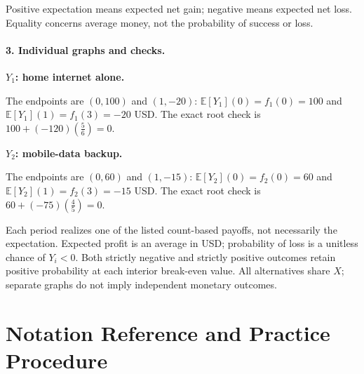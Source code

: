 Positive expectation means expected net gain; negative means expected net loss. Equality concerns average money, not the probability of success or loss.
\clearpage\paragraph{3. Individual graphs and checks.}
\textbf{$Y_1$: home internet alone.}
\begin{center}\end{center}
The endpoints are $(0,100)$ and $(1,-20)$: $\mathbb E[Y_1](0)=f_1(0)=100$ and
$\mathbb E[Y_1](1)=f_1(3)=-20$ USD.
The exact root check is $100+(-120)(\frac{5}{6})=0$.
\par\medskip
\textbf{$Y_2$: mobile-data backup.}
\begin{center}\end{center}
The endpoints are $(0,60)$ and $(1,-15)$: $\mathbb E[Y_2](0)=f_2(0)=60$ and
$\mathbb E[Y_2](1)=f_2(3)=-15$ USD.
The exact root check is $60+(-75)(\frac{4}{5})=0$.
\par\medskip
Each period realizes one of the listed count-based payoffs, not necessarily the expectation.
Expected profit is an average in USD; probability of loss is a unitless chance of $Y_i<0$.
Both strictly negative and strictly positive outcomes retain positive probability at each interior break-even value.
All alternatives share $X$; separate graphs do not imply independent monetary outcomes.

\clearpage
\section{Notation Reference and Practice Procedure}\label{sec:notation-and-procedure}
